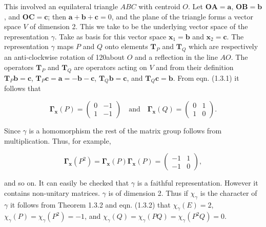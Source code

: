 \documentclass[11pt,a4paper,twoside,openright]{book}
\begin{document}
This involved an equilateral triangle $ABC$ with centroid $O$. Let $\mathbf{OA} = \mathbf{a}$, $\mathbf{OB} = \mathbf{b}$, and $\mathbf{OC} = \mathbf{c}$; then $\mathbf{a} + \mathbf{b} + \mathbf{c} = 0$, and the plane of the triangle forms a vector space $V$ of dimension 2. This we take to be the underlying vector space of the representation $\gamma$. Take as basis for this vector space $\mathbf{x}_{1} = \mathbf{b}$ and $\mathbf{x}_{2} = \mathbf{c}$. The representation $\gamma$ maps $P$ and $Q$ onto elements $\mathbf{T}_{P}$ and $\mathbf{T}_{Q}$ which are respectively an anti-clockwise rotation of 120\textdegree  about $O$ and a reflection in the line $AO$. The operators $\mathbf{T}_{P}$ and $\mathbf{T}_{Q}$ are operators acting on $V$ and from their definition $\mathbf{T}_{P}\mathbf{b} = \mathbf{c}$, $\mathbf{T}_{P}\mathbf{c} = \mathbf{a} = -\mathbf{b}-\mathbf{c}$, $\mathbf{T}_{Q}\mathbf{b} = \mathbf{c}$, and $\mathbf{T}_{Q}\mathbf{c} = \mathbf{b}$. From eqn. (1.3.1) it follows that

\begin{equation*}
\boldsymbol{\Gamma}_{\mathbf{x}}(P) = \begin{pmatrix} 0 & -1 \\ 1 & -1 \end{pmatrix} \quad \text{and} \quad \boldsymbol{\Gamma}_{\mathbf{x}}(Q) = \begin{pmatrix} 0 & 1 \\ 1 & 0 \end{pmatrix}. \tag{1.3.2}
\end{equation*}

Since $\gamma$ is a homomorphism the rest of the matrix group follows from multiplication. Thus, for example,

\begin{equation*}
\boldsymbol{\Gamma}_{\mathbf{x}}(P^{2}) = \boldsymbol{\Gamma}_{\mathbf{x}}(P)\boldsymbol{\Gamma}_{\mathbf{x}}(P) = \begin{pmatrix} -1 & 1 \\ -1 & 0 \end{pmatrix}, \tag{1.3.3}
\end{equation*}

and so on. It can easily be checked that $\gamma$ is a faithful representation. However it contains non-unitary matrices. $\gamma$ is of dimension 2. Thus if $\chi_{\gamma}$ is the character of $\gamma$ it follows from Theorem 1.3.2 and eqn. (1.3.2) that $\chi_{\gamma}(E) = 2$, $\chi_{\gamma}(P) = \chi_{\gamma}(P^{2}) = -1$, and $\chi_{\gamma}(Q) = \chi_{\gamma}(PQ) = \chi_{\gamma}(P^{2}Q) = 0$.
\end{document}

